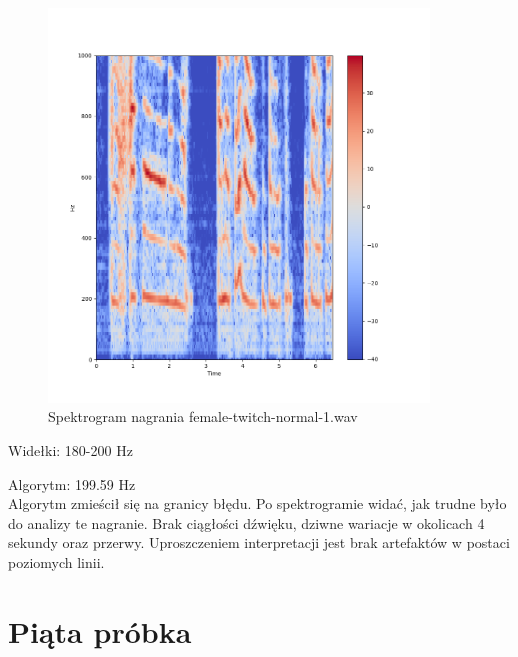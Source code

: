 \documentclass[a4paper,12pt]{extarticle}
\begin{document}
\begin{figure}[h!]
\centering
\includegraphics[width=0.9\textwidth]{female-twitch-normal-1}
\caption{Spektrogram nagrania female-twitch-normal-1.wav}
\end{figure}

\noindent Widełki: 180-200 Hz

\noindent Algorytm: 199.59 Hz\\

\noindent Algorytm zmieścił się na granicy błędu. Po spektrogramie widać, jak trudne było do analizy te nagranie. Brak ciągłości dźwięku, dziwne wariacje w okolicach 4 sekundy oraz przerwy. Uproszczeniem interpretacji jest brak artefaktów w postaci poziomych linii.

\clearpage

\section*{Piąta próbka}
\end{document}
